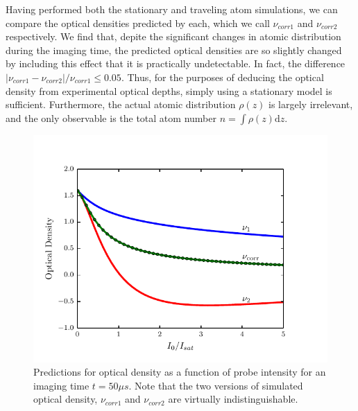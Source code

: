 \documentclass[12pt]{iopart}
\begin{document}
\par Having performed both the stationary and traveling atom simulations, we can compare the optical densities predicted by each, which we call $\nu_{corr1}$ and $\nu_{corr2}$ respectively. We find that, depite the significant changes in atomic distribution during the imaging time, the predicted optical densities are so slightly changed by including this effect that it is practically undetectable. In fact, the difference $\left|\nu_{corr1}-\nu_{corr2}\right|/\nu_{corr1} \le 0.05$. Thus, for the purposes of deducing the optical density from experimental optical depths, simply using a stationary model is sufficient. Furthermore, the actual atomic distribution $\rho(z)$ is largely irrelevant, and the only observable is the total atom number $n=\int\rho(z)\mathrm{d}z$. 
\begin{figure}
	\includegraphics{figure7.pdf}
\caption{Predictions for optical density as a function of probe intensity for an imaging time $t=50\mu s$. Note that the two versions of simulated optical density, $\nu_{corr1}$ and $\nu_{corr2}$ are virtually indistinguishable. }  
\label{fig:atomTravel}
\end{figure}
\end{document}
